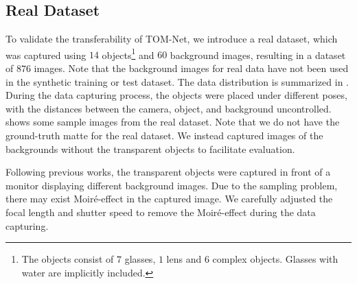 \begin{table}[t] \centering
    \caption[Statistics of our real dataset]{Statistics of our real dataset. The first and second rows show the number of objects and the number of backgrounds used during data acquisition, respectively. The last row shows the number of captured samples. Note that the category of \emph{Glass with Water} are created by filling five of the glasses with different amount of water, and some backgrounds are shared between different shape categories.}
    \label{tab:real_data}
\end{table}
\subsection{Real Dataset}
\label{sub:Real Dataset}
To validate the transferability of TOM-Net, we introduce a real dataset, which was captured using $14$ objects\footnote{The objects consist of $7$ glasses, $1$ lens and $6$ complex objects. Glasses with water are implicitly included.} and $60$ background images, resulting in a dataset of $876$ images. Note that the background images for real data have not been used in the synthetic training or test dataset. The data distribution is summarized in . During the data capturing process, the objects were placed under different poses, with the distances between the camera, object, and background uncontrolled.  shows some sample images from the real dataset.  Note that we do not have the ground-truth matte for the real dataset. We instead captured images of the backgrounds without the transparent objects to facilitate evaluation.

Following previous works, the transparent objects were captured in front of a monitor displaying different background images.
Due to the sampling problem, there may exist Moir\'{e}-effect in the captured image.  We carefully adjusted the focal length and shutter speed to remove the Moir\'{e}-effect during the data capturing.

